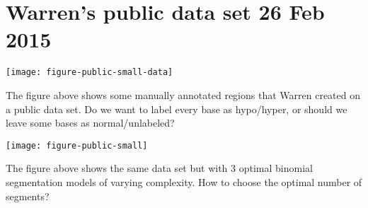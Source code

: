 \documentclass[12pt]{article}
\begin{document}
\section{Warren's public data set 26 Feb 2015}

\texttt{[image: figure-public-small-data]}

The figure above shows some manually annotated regions that Warren
created on a public data set. Do we want to label every base as
hypo/hyper, or should we leave some bases as normal/unlabeled?

\texttt{[image: figure-public-small]}

The figure above shows the same data set but with 3 optimal binomial
segmentation models of varying complexity. How to choose the optimal
number of segments?




\end{document}
